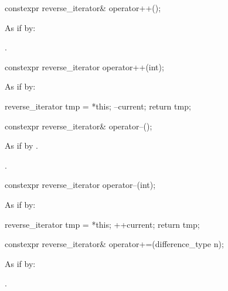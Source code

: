 %
\begin{itemdecl}
constexpr reverse_iterator& operator++();
\end{itemdecl}

\begin{itemdescr}
\pnum
\effects
As if by: 

\pnum
\returns
{}.
\end{itemdescr}

%
\begin{itemdecl}
constexpr reverse_iterator operator++(int);
\end{itemdecl}

\begin{itemdescr}
\pnum
\effects
As if by:
\begin{codeblock}
reverse_iterator tmp = *this;
--current;
return tmp;
\end{codeblock}
\end{itemdescr}

%
\begin{itemdecl}
constexpr reverse_iterator& operator--();
\end{itemdecl}

\begin{itemdescr}
\pnum
\effects
As if by .

\pnum
\returns
{}.
\end{itemdescr}

%
\begin{itemdecl}
constexpr reverse_iterator operator--(int);
\end{itemdecl}

\begin{itemdescr}
\pnum
\effects
As if by:
\begin{codeblock}
reverse_iterator tmp = *this;
++current;
return tmp;
\end{codeblock}
\end{itemdescr}

%
\begin{itemdecl}
constexpr reverse_iterator& operator+=(difference_type n);
\end{itemdecl}

\begin{itemdescr}
\pnum
\effects
As if by: 

\pnum
\returns
{}.
\end{itemdescr}

